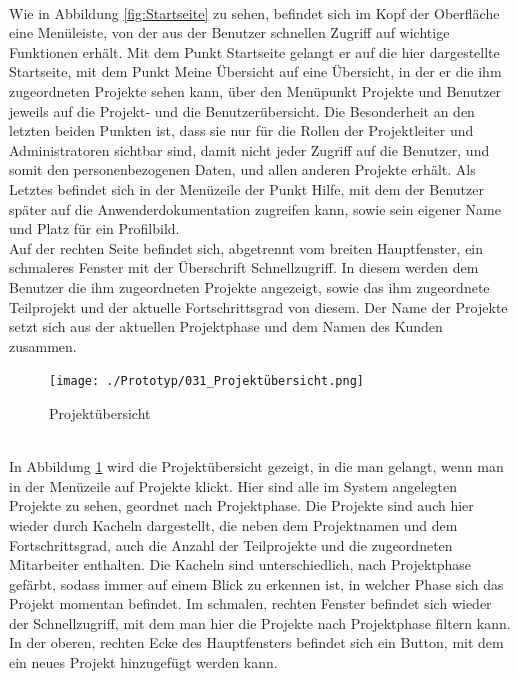 \\Wie in Abbildung \ref{fig:Startseite} zu sehen, befindet sich im Kopf der Oberfläche eine Menüleiste, von der aus der Benutzer schnellen Zugriff auf wichtige Funktionen erhält. Mit dem Punkt \glqq{}Startseite\grqq{} gelangt er auf die hier dargestellte Startseite, mit dem Punkt \glqq{}Meine Übersicht\grqq{} auf eine Übersicht, in der er die ihm zugeordneten Projekte sehen kann, über den Menüpunkt \glqq{}Projekte\grqq{} und \glqq{}Benutzer\grqq{} jeweils auf die Projekt- und die Benutzerübersicht. Die Besonderheit an den letzten beiden Punkten ist, dass sie nur für die Rollen der Projektleiter und Administratoren sichtbar sind, damit nicht jeder Zugriff auf die Benutzer, und somit den personenbezogenen Daten, und allen anderen Projekte erhält. Als Letztes befindet sich in der Menüzeile der Punkt \glqq{}Hilfe\grqq{}, mit dem der Benutzer später auf die Anwenderdokumentation zugreifen kann, sowie sein eigener Name und Platz für ein Profilbild.\\Auf der rechten Seite befindet sich, abgetrennt vom breiten Hauptfenster, ein schmaleres Fenster mit der Überschrift Schnellzugriff. In diesem werden dem Benutzer die ihm zugeordneten Projekte angezeigt, sowie das ihm zugeordnete Teilprojekt und der aktuelle Fortschrittsgrad von diesem. Der Name der Projekte setzt sich aus der aktuellen Projektphase und dem Namen des Kunden zusammen.
\begin{figure}[h!]
    \centering
    \texttt{[image: ./Prototyp/031\_Projektübersicht.png]}
    \caption[Prototyp: Projektübersicht]{Projektübersicht}
    \label{fig:Projektübersicht}
\end{figure}
\\In Abbildung \ref{fig:Projektübersicht} wird die Projektübersicht gezeigt, in die man gelangt, wenn man in der Menüzeile auf \glqq{}Projekte\grqq{} klickt. Hier sind alle im System angelegten Projekte zu sehen, geordnet nach Projektphase. Die Projekte sind auch hier wieder durch Kacheln dargestellt, die neben dem Projektnamen und dem Fortschrittsgrad, auch die Anzahl der Teilprojekte und die zugeordneten Mitarbeiter enthalten. Die Kacheln sind unterschiedlich, nach Projektphase gefärbt, sodass immer auf einem Blick zu erkennen ist, in welcher Phase sich das Projekt momentan befindet. Im schmalen, rechten Fenster befindet sich wieder der Schnellzugriff, mit dem man hier die Projekte nach Projektphase filtern kann. In der oberen, rechten Ecke des Hauptfensters befindet sich ein Button, mit dem ein neues Projekt hinzugefügt werden kann.
